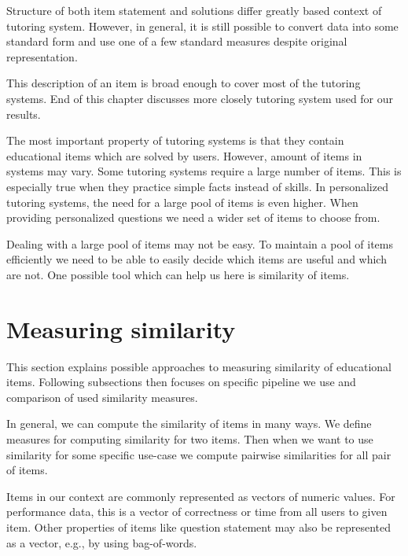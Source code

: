 \documentclass[
  digital, %
  table,   %
  nolof,     %
  nolot,     %
  nocover,
  color,
  final, %
]{fithesis3}
\begin{document}
Structure of both item statement and solutions differ greatly based context of tutoring system. However, in general, it is still possible to convert data into some standard form and use one of a few standard measures despite original representation.

This description of an item is broad enough to cover most of the tutoring systems. End of this chapter discusses more closely tutoring system used for our results.


The most important property of tutoring systems is that they contain educational items which are solved by users. However, amount of items in systems may vary. Some tutoring systems require a large number of items. This is especially true when they practice simple facts instead of skills. In personalized tutoring systems, the need for a large pool of items is even higher. When providing personalized questions we need a wider set of items to choose from.


Dealing with a large pool of items may not be easy. To maintain a pool of items efficiently we need to be able to easily decide which items are useful and which are not. One possible tool which can help us here is similarity of items.


\section{Measuring similarity}\label{measuring-similarity}

This section explains possible approaches to measuring similarity of educational items. Following subsections then focuses on specific pipeline we use and comparison of used similarity measures.


In general, we can compute the similarity of items in many ways. We define measures for computing similarity for two items. Then when we want to use similarity for some specific use-case we compute pairwise similarities for all pair of items.

Items in our context are commonly represented as vectors of numeric values. For performance data, this is a vector of correctness or time from all users to given item. Other properties of items like question statement may also be represented as a vector, e.g., by using bag-of-words.
\end{document}
